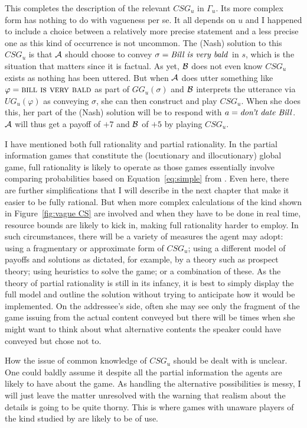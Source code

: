 This completes the description of the relevant $CSG_u$ in $\Gamma_u$. Its more complex form has nothing to do with vagueness per se. It all depends on $u$ and I happened to include a choice between a relatively more precise statement and a less precise one as this kind of occurrence is not uncommon. The (Nash) solution to this $CSG_u$ is that $\cal A$ should choose to convey $\sigma = \hbox{\emph{Bill is very bald}}$ in $s$, which is the situation that matters since it is factual. As yet, $\cal B$ does not even know $CSG_u$ exists as nothing has been uttered. But when $\cal A$ does utter something like $\varphi = \Expression{Bill is very bald}$ as part of $GG_u(\sigma)$ and $\cal B$ interprets the utterance via $UG_u(\varphi)$ as conveying $\sigma$, she can then construct and play $CSG_u$. When she does this, her part of the (Nash) solution will be to respond with $a = \hbox{\emph{don't date Bill}}$. $\cal A$ will thus get a payoff of $+7$ and $\cal B$ of $+5$ by playing $CSG_u$.

I have mentioned both full rationality and partial rationality. In the partial information games that constitute the (locutionary and illocutionary) global game, full rationality is likely to operate as those games essentially involve comparing probabilities based on Equation~\ref{eq:simple} from . Even here, there are further simplifications that I will describe in the next chapter that make it easier to be fully rational. But when more complex calculations of the kind shown in Figure~\ref{fig:vague CS} are involved and when they have to be done in real time, resource bounds are likely to kick in, making full rationality harder to employ. In such circumstances, there will be a variety of measures the agent may adopt: using a fragmentary or approximate form of $CSG_u$; using a different model of payoffs and solutions as dictated, for example, by a theory such as  prospect theory; using heuristics to solve the game; or a combination of these. As the theory of partial rationality is still in its infancy, it is best to simply display the full model and outline the solution without trying to anticipate how it would be implemented. On the addressee's side, often she may see only the fragment of the game issuing from the actual content conveyed but there will be times when she might want to think about what alternative contents the speaker could have conveyed but chose not to.

How the issue of common knowledge of $CSG_u$ should be dealt with is unclear. One could baldly assume it despite all the partial information the agents are likely to have about the game. As handling the alternative possibilities is messy, I will just leave the matter unresolved with the warning that realism about the details is going to be quite thorny. This is where games with unaware players of the kind studied by \citet{hr:egpup, hr:gscgpup} are likely to be of use.

